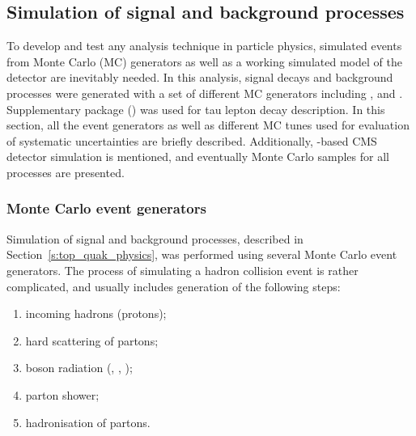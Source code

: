 
\subsection{Simulation of signal and background processes}
\label{ss_top_mass:signal_and_background}

To develop and test any analysis technique in particle physics, simulated events from Monte Carlo (MC) generators as
well as a working simulated model of the detector are inevitably needed. In this analysis, \ttbar signal decays and
background processes were generated with a set of different MC generators including \MADGRAPH \autocite{MadGraph},
\PYTHIA \autocite{Pythia,Pythia6.4} and \POWHEG \autocite{POWHEG}. Supplementary package (\TAUOLA \autocite{TAUOLA}) was
used for tau lepton decay description. In this section, all the event generators as well as different MC tunes used for
evaluation of systematic uncertainties are briefly described. Additionally, \GEANTfour-based \autocite{GEANT4} CMS
detector simulation is mentioned, and eventually Monte Carlo samples for all processes are presented.

\subsubsection{Monte Carlo event generators}
\label{ss_top_mass:MC_generators}

Simulation of \ttbar signal and background processes, described in Section~\ref{s:top_quak_physics}, was performed using
several Monte Carlo event generators. The process of simulating a hadron collision event is rather complicated, and
usually includes generation of the following steps:

\begin{enumerate}[label=\textbullet]
	\item incoming hadrons (protons);
	\item hard scattering of partons;
	\item boson radiation (\Z, \photon, \cPg);
	\item parton shower;
	\item hadronisation of partons.
\end{enumerate}

